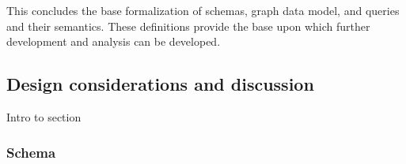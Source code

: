 
This concludes the base formalization of \gql schemas, graph data model, and queries and their semantics.  These definitions provide the base upon which further development and analysis can be developed.


\subsection{Design considerations and discussion}\label{subsec:discussion}
Intro to section


\subsubsection*{\HP Schema}


